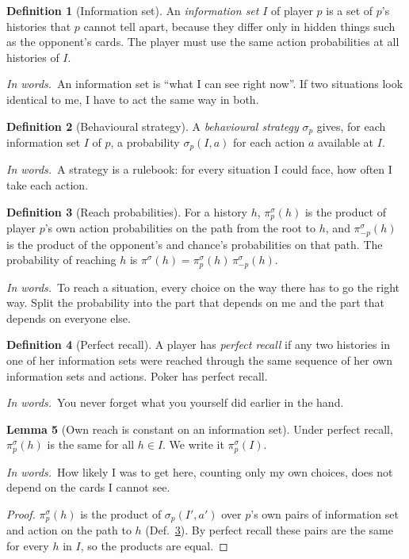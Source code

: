 \documentclass[11pt]{article}
\theoremstyle{definition}
\newtheorem{definition}{Definition}[section]
\newtheorem{lemma}[definition]{Lemma}
\newcommand{\inwords}{\par\smallskip\noindent\textit{In words.}\ }
\newcommand{\Def}[1]{Def.~\ref{#1}}\newcommand{\Lem}[1]{Lemma~\ref{#1}}\newcommand{\Thm}[1]{Thm.~\ref{#1}}
\begin{document}
\begin{definition}[Information set]\label{def:infoset}
An \emph{information set} $I$ of player $p$ is a set of $p$'s histories that $p$ cannot tell apart, because they differ
only in hidden things such as the opponent's cards. The player must use the same action probabilities at all histories
of $I$.
\inwords An information set is ``what I can see right now''. If two situations look identical to me, I have to act the
same way in both.
\end{definition}

\begin{definition}[Behavioural strategy]\label{def:behav}
A \emph{behavioural strategy} $\sigma_p$ gives, for each information set $I$ of $p$, a probability $\sigma_p(I,a)$ for each
action $a$ available at $I$.
\inwords A strategy is a rulebook: for every situation I could face, how often I take each action.
\end{definition}

\begin{definition}[Reach probabilities]\label{def:reach}
For a history $h$, $\pi_p^\sigma(h)$ is the product of player $p$'s own action probabilities on the path from the root to
$h$, and $\pi_{-p}^\sigma(h)$ is the product of the opponent's and chance's probabilities on that path. The probability of
reaching $h$ is $\pi^\sigma(h)=\pi_p^\sigma(h)\,\pi_{-p}^\sigma(h)$.
\inwords To reach a situation, every choice on the way there has to go the right way. Split the probability into the
part that depends on me and the part that depends on everyone else.
\end{definition}

\begin{definition}[Perfect recall]\label{def:recall}
A player has \emph{perfect recall} if any two histories in one of her information sets were reached through the same
sequence of her own information sets and actions. Poker has perfect recall.
\inwords You never forget what you yourself did earlier in the hand.
\end{definition}

\begin{lemma}[Own reach is constant on an information set]\label{lem:ownreach}
Under perfect recall, $\pi_p^\sigma(h)$ is the same for all $h\in I$. We write it $\pi_p^\sigma(I)$.
\inwords How likely I was to get here, counting only my own choices, does not depend on the cards I cannot see.
\end{lemma}
\begin{proof}
$\pi_p^\sigma(h)$ is the product of $\sigma_p(I',a')$ over $p$'s own pairs of information set and action on the path to $h$
(\Def{def:reach}). By perfect recall these pairs are the same for every $h$ in $I$, so the products are equal.
\end{proof}
\end{document}
